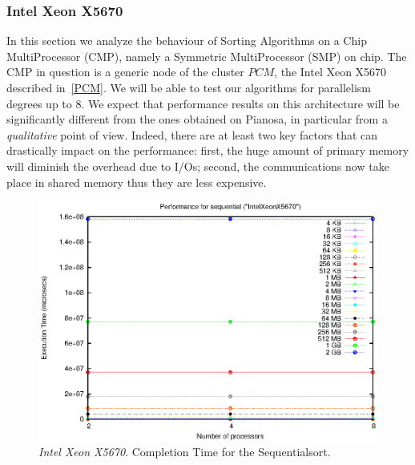 \subsubsection{Intel Xeon X5670}
In this section we analyze the behaviour of Sorting Algorithms on a Chip MultiProcessor (CMP), namely a Symmetric MultiProcessor (SMP) on chip. The CMP in question is a generic node of the cluster $PCM$, the Intel Xeon X5670 described in~\ref{PCM}. We will be able to test our algorithms for parallelism degrees up to 8. We expect that performance results on this architecture will be significantly different from the ones obtained on Pianosa, in particular from a \textit{qualitative} point of view. Indeed, there are at least two key factors that can drastically impact on the performance: first, the huge amount of primary memory will diminish the overhead due to I/Os; second, the communications now take place in shared memory thus they are less expensive.

\begin{figure}[t]
	\begin{center}
		\includegraphics[scale=0.6]{plots/test_01_IntelXeonX5670/NxTxM/sequential_IntelXeonX5670_NxTxM}
	\end{center}
  	\caption{\textit{Intel Xeon X5670}. Completion Time for the Sequentialsort.}
  	\label{sequential-IntelXeonX5670}
\end{figure}

